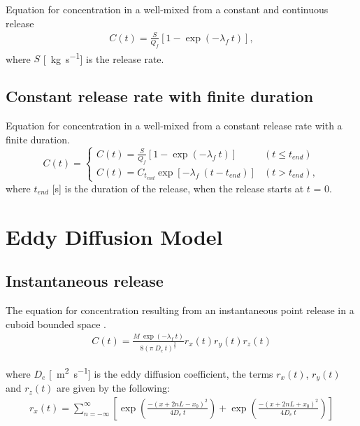 \documentclass[]{article}
\begin{document}
Equation for concentration in a well-mixed from a constant and continuous release
\begin{eqnarray}\label{eq:WMCont}
	C(t) = \frac{S}{Q_f} \left[1 - \exp\left( -\lambda_f\:t\right) \right],
\end{eqnarray}
where $S$ [\SI{}{\kilo\gram\per\second}] is the release rate. 

\subsection{Constant release rate with finite duration}\label{sec:WMFinite}

Equation for concentration in a well-mixed from a constant release rate with a
finite duration.
\begin{equation}\label{eq:WMFinite}
	C(t) = 
	\begin{cases} 
		C(t) = \frac{S}{Q_f} \left[1 - \exp\left( -\lambda_f\:t\right) \right]								& (t \leq t_{end}) \\
		C(t) = C_{t_{end}} \exp\left[-\lambda_f\:(t - t_{end})\right]											& (t > t_{end}),
	\end{cases} 
\end{equation}
where $t_{end}$ [s] is the duration of the release, when the release starts at
$t$ = 0.

\section{Eddy Diffusion Model}\label{app:eddydiff}

\subsection{Instantaneous release}\label{app:EddyInst}

The equation for concentration resulting from an instantaneous point release in
a cuboid bounded space \cite{drivas96}.
\begin{eqnarray}\label{eq:cuboid-decay-inst}
	C(t) = \frac{M\: \exp(-\lambda_f\:t)}{8(\pi\:D_e\:t)^{\frac{3}{2}}} r_{x}(t)
	r_{y}(t) r_{z}(t)
\end{eqnarray}

where $D_e$ [\SI{}{\meter\squared\per\second}] is the eddy diffusion
coefficient, the terms $r_{x}(t)$, $r_{y}(t)$ and $r_{z}(t)$ are given by the
following:
\begin{eqnarray}
	r_{x}(t) = \sum^{\infty}_{n = -\infty} \left[\exp\left(\frac{-(x + 2nL -
	x_{0})^{2}}{4D_e\:t}\right) + \exp\left(\frac{-(x + 2nL +
	x_{0})^{2}}{4D_e\:t}\right)\right]
\end{eqnarray}
\end{document}

